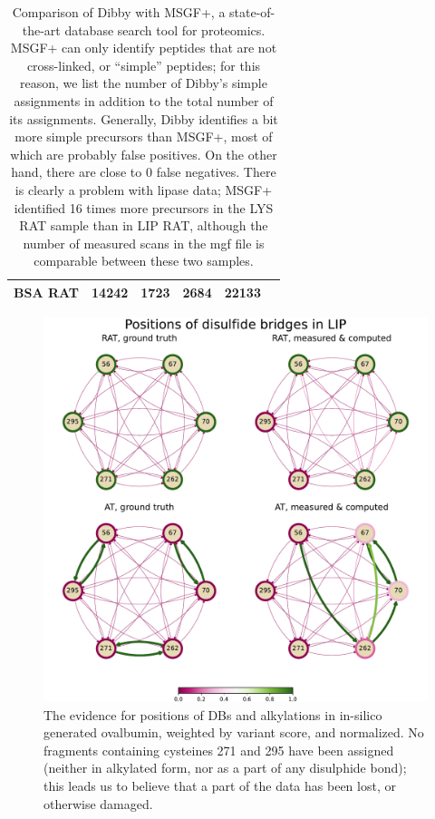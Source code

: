\begin{table}[ht]
\begin{tabular}{@{}llllll@{}}
    BSA RAT                                              & 14242                           & 1723                                                                   & 2684                              & 22133 &     \\ \bottomrule
  \end{tabular}
  \caption{Comparison of Dibby with MSGF+, a state-of-the-art database search tool for proteomics. MSGF+ can only identify peptides that are not cross-linked, or ``simple'' peptides; for this reason, we list the number of Dibby's simple assignments in addition to the total number of its assignments. Generally, Dibby identifies a bit more simple precursors than MSGF+, most of which are probably false positives. On the other hand, there are close to 0 false negatives. There is clearly a problem with lipase data; MSGF+ identified 16 times more precursors in the LYS RAT sample than in LIP RAT, although the number of measured scans in the mgf file is comparable between these two samples.}\label{tbl:measurements}
\end{table}

\begin{figure}
  \centering
  \includegraphics[width=0.8\linewidth]{img/lip.pdf}
  \caption{The evidence for positions of DBs and alkylations in in-silico generated ovalbumin, weighted by variant score, and normalized. No fragments containing cysteines 271 and 295 have been assigned (neither in alkylated form, nor as a part of any disulphide bond); this leads us to believe that a part of the data has been lost, or otherwise damaged.}\label{fig:lip}
\end{figure}

